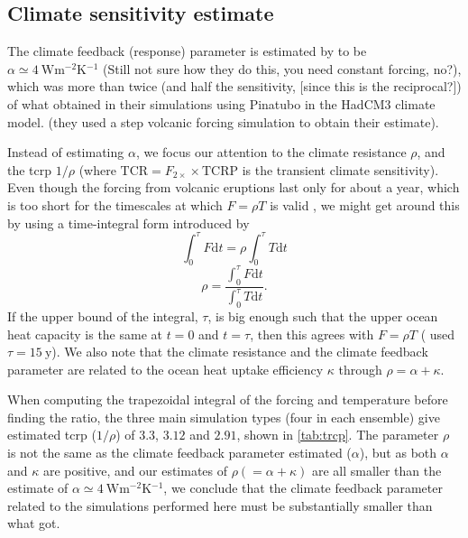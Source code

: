 \documentclass{ametsocV5}
\begin{document}
\subsection{Climate sensitivity estimate}%
\label{sec:climate-sensitivity-estimate}

The climate feedback (response) parameter is estimated by \citet{jones2005} to be
\(\alpha \simeq \SI{4}{\watt\metre^{-2}\kelvin^{-1}}\) (Still not sure how they do this,
you need constant forcing, no?), which was more than twice (and half the sensitivity,
[since this is the reciprocal?]) of what \citet{gregory2016} obtained in their
simulations using Pinatubo in the HadCM3 climate model. (they used a step volcanic
forcing simulation to obtain their estimate).

Instead of estimating \(\alpha \), we focus our attention to the climate resistance
\(\rho \), and the \ac{tcrp} \(1/\rho\) (where \(\mathrm{TCR}=F_{2\times}\times
\mathrm{TCRP}\) is the transient climate sensitivity). Even though the forcing from
volcanic eruptions last only for about a year, which is too short for the timescales at
which \(F=\rho T\) is valid \citep{gregory2016}, we might get around this by using a
time-integral form introduced by \citet{merlis2014}
\begin{equation}
  \int_0^{\tau}F \mathrm{d}t=\rho\int_{0}^{\tau}T \mathrm{d}t
\end{equation}
\begin{equation}
  \rho=\frac{\int_0^{\tau}F \mathrm{d}t}{\int_{0}^{\tau}T \mathrm{d}t}.
  \label{eq:climate-resistance}
\end{equation}
%
If the upper bound of the integral, \(\tau \), is big enough such that the upper ocean
heat capacity is the same at \(t=0\) and \(t=\tau \), then this agrees with \(F=\rho T\)
\citep{gregory2016} (\citet{merlis2014} used \(\tau =\SI{15}{\mathrm{y}}\)). We also
note that the climate resistance and the climate feedback parameter are related to the
ocean heat uptake efficiency \(\kappa \) through \(\rho =\alpha +\kappa \).

When computing the trapezoidal integral of the forcing and temperature before finding
the ratio, the three main simulation types (four in each ensemble) give estimated
\ac{tcrp} (\(1/\rho\)) of \(3.3\), \(3.12\) and \(2.91\), shown in \cref{tab:trcp}. The
parameter \(\rho\) is not the same as the climate feedback parameter \citet{jones2005}
estimated (\(\alpha\)), but as both \(\alpha \) and \(\kappa \) are positive, and our
estimates of \(\rho (=\alpha +\kappa) \) are all smaller than the \citet{jones2005}
estimate of \(\alpha \simeq \SI{4}{\watt\metre^{-2}\kelvin^{-1}}\), we conclude that the
climate feedback parameter related to the simulations performed here must be
substantially smaller than what \citet{jones2005} got.
\end{document}
